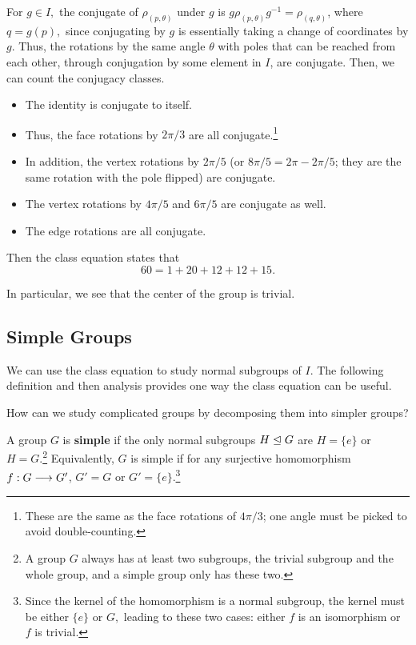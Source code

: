 For $g \in I,$ the conjugate of $\rho_{(p, \theta)}$ under $g$ is $g\rho_{(p, \theta)} g^{-1} = \rho_{(q, \theta)}$, where $q = g(p),$ since conjugating by $g$ is essentially taking a change of coordinates by $g.$ Thus, the rotations by the same angle $\theta$ with poles that can be reached from each other, through conjugation by some element in $I$, are conjugate. Then, we can count the conjugacy classes. 
\begin{itemize}
    \item The identity is conjugate to itself.
    
    \item Thus, the face rotations by $2\pi/3$ are all conjugate.\footnote{These are the same as the face rotations of $4\pi/3$; one angle must be picked to avoid double-counting.} 
    
    \item In addition, the vertex rotations by $2\pi/5$ (or $8\pi/5 = 2\pi - 2\pi/5$; they are the same rotation with the pole flipped) are conjugate.
    
    \item The vertex rotations by $4\pi/5$ and $6\pi/5$ are conjugate as well. 
    
    \item The edge rotations are all conjugate. 
\end{itemize}

Then the class equation states that 
\[
60 = 1 + 20 + 12 + 12 + 15.
\]

In particular, we see that the center of the group is trivial.

\subsection{Simple Groups}
We can use the class equation to study normal subgroups of $I.$ The following definition and then analysis provides one way the class equation can be useful.

\begin{qq}
How can we study complicated groups by decomposing them into simpler groups? 
\end{qq}

\begin{definition}
A group $G$ is \textbf{simple} if the only normal subgroups $H \trianglelefteq G$ are $H = \{e\}$ or $H = G.$\footnote{A group $G$ always has at least two subgroups, the trivial subgroup and the whole group, and a simple group only has these two.} Equivalently, $G$ is simple if for any surjective homomorphism $f: G \longrightarrow G'$, $G' = G$ or $G' = \{e\}.$\footnote{Since the kernel of the homomorphism is a normal subgroup, the kernel must be either $\{e\}$ or $G,$ leading to these two cases: either $f$ is an isomorphism or $f$ is trivial.}
\end{definition}

